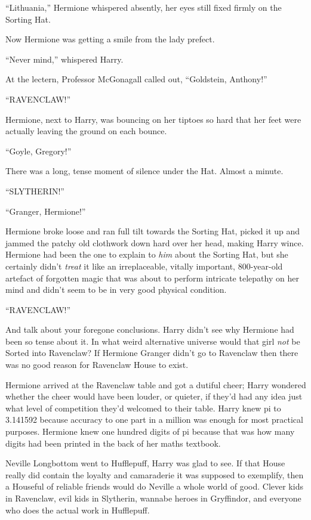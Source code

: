 “Lithuania,” Hermione whispered absently, her eyes still fixed firmly on the
Sorting Hat.

Now Hermione was getting a smile from the lady prefect.

“Never mind,” whispered Harry.

At the lectern, Professor McGonagall called out, “Goldstein, Anthony!”

“RAVENCLAW!”

Hermione, next to Harry, was bouncing on her tiptoes so hard that her feet were
actually leaving the ground on each bounce.

“Goyle, Gregory!”

There was a long, tense moment of silence under the Hat. Almost a minute.

“SLYTHERIN!”

“Granger, Hermione!”

Hermione broke loose and ran full tilt towards the Sorting Hat, picked it up
and jammed the patchy old clothwork down hard over her head, making Harry
wince. Hermione had been the one to explain to \emph{him} about the Sorting
Hat, but she certainly didn’t \emph{treat} it like an irreplaceable, vitally
important, 800-year-old artefact of forgotten magic that was about to perform
intricate telepathy on her mind and didn’t seem to be in very good physical
condition.

“RAVENCLAW!”

And talk about your foregone conclusions. Harry didn’t see why Hermione had
been so tense about it. In what weird alternative universe would that girl
\emph{not} be Sorted into Ravenclaw? If Hermione Granger didn’t go to Ravenclaw
then there was no good reason for Ravenclaw House to exist.

Hermione arrived at the Ravenclaw table and got a dutiful cheer; Harry wondered
whether the cheer would have been louder, or quieter, if they’d had any idea
just what level of competition they’d welcomed to their table. Harry knew pi to
3.141592 because accuracy to one part in a million was enough for most
practical purposes. Hermione knew one hundred digits of pi because that was how
many digits had been printed in the back of her maths textbook.

Neville Longbottom went to Hufflepuff, Harry was glad to see. If that House
really did contain the loyalty and camaraderie it was supposed to exemplify,
then a Houseful of reliable friends would do Neville a whole world of good.
Clever kids in Ravenclaw, evil kids in Slytherin, wannabe heroes in Gryffindor,
and everyone who does the actual work in Hufflepuff.

